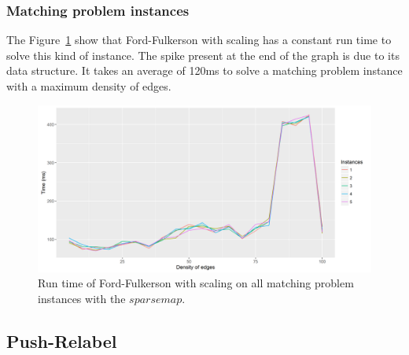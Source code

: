 \subsubsection{Matching problem instances}
The Figure~\ref{fig:ffmatching} show that Ford-Fulkerson with scaling has a constant run time to solve this kind of instance. The spike present at the end of the graph is due to its data structure. It takes an average of 120ms to solve a matching problem instance with a maximum density of edges.
\begin{figure}[H]
\begin{center}
\includegraphics[scale=0.5]{images/results/ffmatching.png}
\caption{Run time of Ford-Fulkerson with scaling on all matching problem instances with the $sparse map$.}
\label{fig:ffmatching}
\end{center}
\end{figure}


\subsection{Push-Relabel}
